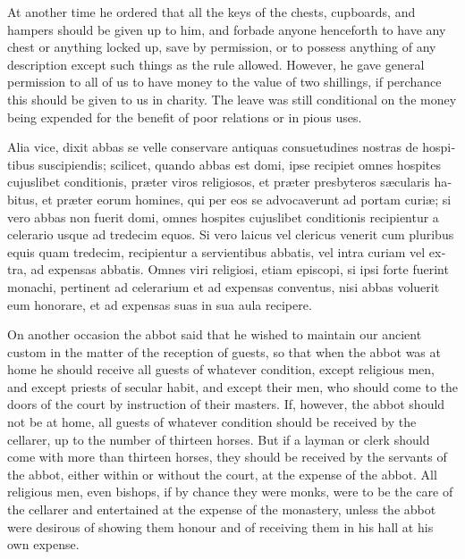 \documentclass[10pt]{book}
\begin{document}
\begin{paracol}{2}
\begin{otherlanguage}{latin}
\end{otherlanguage}

\switchcolumn

At another time he ordered that all the keys of the chests, cupboards, and hampers should be given up to him, and forbade anyone henceforth to have any chest or anything locked up, save by permission, or to possess anything of any description except such things as the rule allowed. However, he gave general permission to all of us to have money to the value of two shillings, if perchance this should be given to us in charity. The leave was still conditional on the money being expended for the benefit of poor relations or in pious uses.

\switchcolumn*

\begin{otherlanguage}{latin}
Alia vice, dixit abbas se velle conservare antiquas consuetudines nostras de hospitibus suscipiendis; scilicet, quando abbas est domi, ipse recipiet omnes hospites cujuslibet conditionis, pr\ae{}ter viros religiosos, et pr\ae{}ter presbyteros s\ae{}cularis habitus, et pr\ae{}ter eorum homines, qui per eos se advocaverunt ad portam curi\ae{}; si vero abbas non fuerit domi, omnes hospites cujuslibet conditionis recipientur a celerario usque ad tredecim equos. Si vero laicus vel clericus venerit cum pluribus equis quam tredecim, recipientur a servientibus abbatis, vel intra curiam vel extra, ad expensas abbatis. Omnes viri religiosi, etiam episcopi, si ipsi forte fuerint monachi, pertinent ad celerarium et ad expensas conventus, nisi abbas voluerit eum honorare, et ad expensas suas in sua aula recipere.
\end{otherlanguage}

\switchcolumn

On another occasion the abbot said that he wished to maintain our ancient custom in the matter of the reception of guests, so that when the abbot was at home he should receive all guests of whatever condition, except religious men, and except priests of secular habit, and except their men, who should come to the doors of the court by instruction of their masters. If, however, the abbot should not be at home, all guests of whatever condition should be received by the cellarer, up to the number of thirteen horses. But if a layman or clerk should come with more than thirteen horses, they should be received by the servants of the abbot, either within or without the court, at the expense of the abbot. All religious men, even bishops, if by chance they were monks, were to be the care of the cellarer and entertained at the expense of the monastery, unless the abbot were desirous of showing them honour and of receiving them in his hall at his own expense.


\end{paracol}
\end{document}
